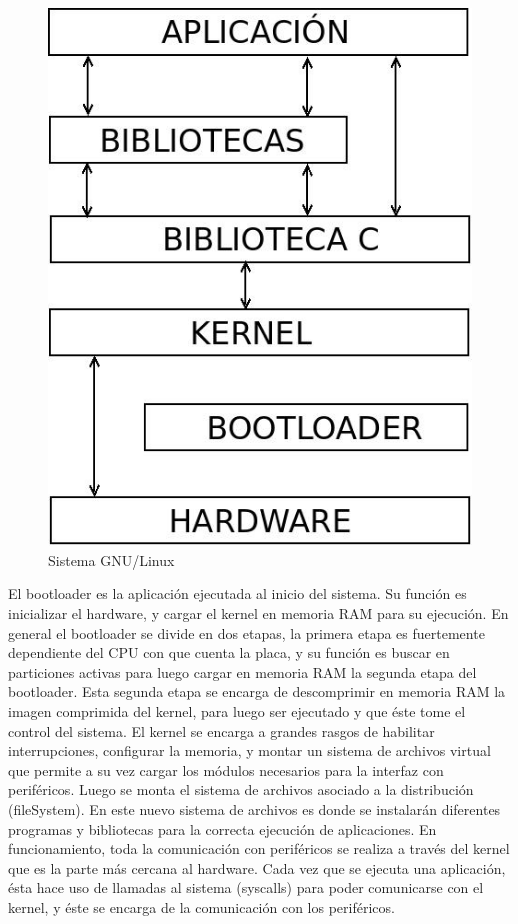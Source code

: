 \begin{figure}[H]
\centering
  \begin{center}
  \includegraphics[scale=.4]{Imagenes/SisLinux.jpg} 
  \end{center}
  \caption{Sistema GNU/Linux}\label{Fig:SisLinux} 
\end{figure}

El bootloader es la aplicación ejecutada al inicio del sistema. Su función es inicializar el hardware, y cargar el kernel en memoria RAM para su ejecución. En general el bootloader se divide en dos etapas, la primera etapa es fuertemente dependiente
del CPU con que cuenta la placa, y su función es buscar en particiones activas para luego cargar 
en memoria RAM la segunda etapa del bootloader. Esta segunda etapa se encarga de descomprimir
en memoria RAM la imagen comprimida del kernel, para luego ser ejecutado y que éste tome el
control del sistema.
El kernel se encarga a grandes rasgos de habilitar interrupciones, configurar la memoria, y montar un sistema de archivos virtual que permite a su vez cargar los módulos necesarios para la interfaz con periféricos. Luego se monta el sistema de archivos asociado a la distribución (fileSystem). En este nuevo sistema de archivos es donde se instalarán diferentes programas y bibliotecas para la correcta ejecución de aplicaciones.
En funcionamiento, toda la comunicación con periféricos se realiza a través del kernel que es la parte más cercana al hardware.
Cada vez que se ejecuta una aplicación, ésta hace uso de llamadas al sistema (syscalls) para poder comunicarse con el kernel, y éste se encarga de la comunicación con los periféricos.


